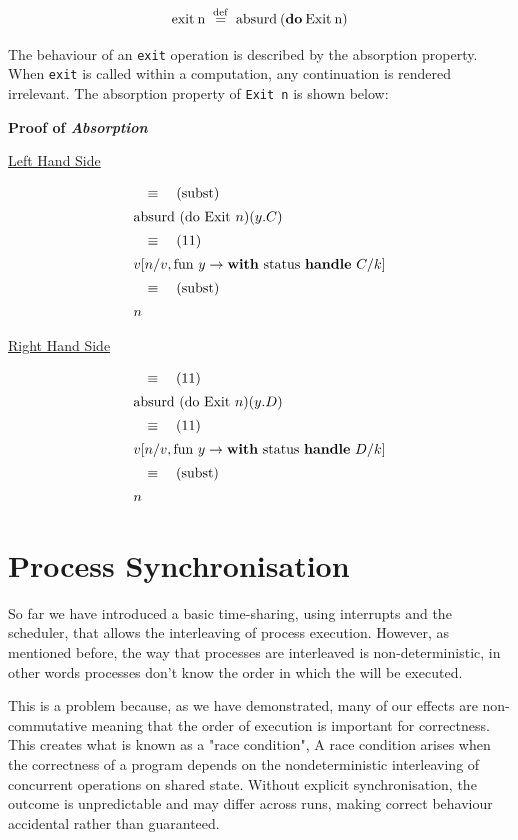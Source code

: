 \documentclass[logo,bsc,singlespacing,parskip]{infthesis}
\begin{document}
\[
\mathrm{exit\:n} \;\overset{\mathrm{def}}{=}\;
  \text{absurd\:(\textbf{do}\:Exit\:n)}
\]


The behaviour of an \lstinline{exit} operation is described by the absorption property. When \lstinline{exit} is called within a computation, any continuation is rendered irrelevant. The absorption property of \lstinline{Exit n} is shown below:



{\large \textbf{Proof of \textit{Absorption}}}

\underline{Left Hand Side}

\[
\begin{array}{l}
\quad\equiv\quad (\text{subst}) \\[5pt]
\text{absurd (do Exit } n) (y. C) \\[5pt]
\quad\equiv\quad (11) \\[5pt]
v [n/v, \text{fun } y \rightarrow \text{\textbf{with} status \textbf{handle} } C/k] \\[5pt]
\quad\equiv\quad (\text{subst}) \\[5pt]
n
\end{array}
\]

\underline{Right Hand Side}

\[
\begin{array}{l}
\quad\equiv\quad (11) \\[5pt]
\text{absurd (do Exit } n) (y. D) \\[5pt]
\quad\equiv\quad (11) \\[5pt]
v [n/v, \text{fun } y \rightarrow \text{\textbf{with} status \textbf{handle} } D/k] \\[5pt]
\quad\equiv\quad (\text{subst}) \\[5pt]
n
\end{array}
\]


\section{Process Synchronisation}
So far we have introduced a basic time-sharing, using interrupts and the scheduler, that allows the interleaving of process execution. However, as mentioned before, the way that processes are interleaved is non-deterministic, in other words processes don't know the order in which the will be executed. 

This is a problem because, as we have demonstrated, many of our effects are non-commutative meaning that the order of execution is important for correctness. This creates what is known as a "race condition", A race condition arises when the correctness of a program depends on the nondeterministic interleaving of concurrent operations on shared state. Without explicit synchronisation, the outcome is unpredictable and may differ across runs, making correct behaviour accidental rather than guaranteed.
\end{document}
